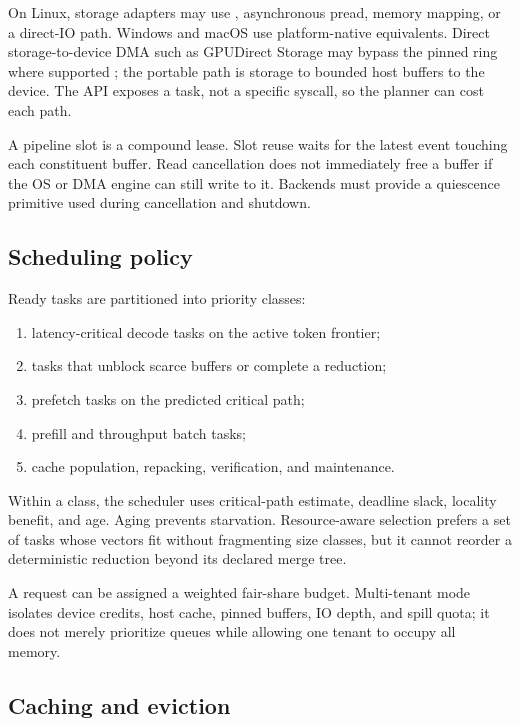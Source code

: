 On Linux, storage adapters may use , asynchronous pread, memory mapping, or a direct-IO path. Windows and macOS use platform-native equivalents. Direct storage-to-device DMA such as GPUDirect Storage may bypass the pinned ring where supported \cite{nvidia_gds}; the portable path is storage to bounded host buffers to the device. The API exposes a task, not a specific syscall, so the planner can cost each path.

A pipeline slot is a compound lease. Slot reuse waits for the latest event touching each constituent buffer. Read cancellation does not immediately free a buffer if the OS or DMA engine can still write to it. Backends must provide a quiescence primitive used during cancellation and shutdown.

\subsection{Scheduling policy}

Ready tasks are partitioned into priority classes:

\begin{enumerate}
  \item latency-critical decode tasks on the active token frontier;
  \item tasks that unblock scarce buffers or complete a reduction;
  \item prefetch tasks on the predicted critical path;
  \item prefill and throughput batch tasks;
  \item cache population, repacking, verification, and maintenance.
\end{enumerate}

Within a class, the scheduler uses critical-path estimate, deadline slack, locality benefit, and age. Aging prevents starvation. Resource-aware selection prefers a set of tasks whose vectors fit without fragmenting size classes, but it cannot reorder a deterministic reduction beyond its declared merge tree.

A request can be assigned a weighted fair-share budget. Multi-tenant mode isolates device credits, host cache, pinned buffers, IO depth, and spill quota; it does not merely prioritize queues while allowing one tenant to occupy all memory.

\subsection{Caching and eviction}


